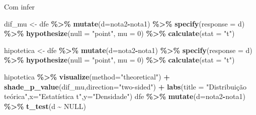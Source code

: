 \documentclass[
  9pt,
  ignorenonframetext,
  aspectratio=169]{beamer}
\newenvironment{Shaded}{\begin{snugshade}}{\end{snugshade}}
\newcommand{\DataTypeTok}[1]{\textcolor[rgb]{0.13,0.29,0.53}{#1}}
\newcommand{\DecValTok}[1]{\textcolor[rgb]{0.00,0.00,0.81}{#1}}
\newcommand{\KeywordTok}[1]{\textcolor[rgb]{0.13,0.29,0.53}{\textbf{#1}}}
\newcommand{\NormalTok}[1]{#1}
\newcommand{\OperatorTok}[1]{\textcolor[rgb]{0.81,0.36,0.00}{\textbf{#1}}}
\newcommand{\OtherTok}[1]{\textcolor[rgb]{0.56,0.35,0.01}{#1}}
\newcommand{\StringTok}[1]{\textcolor[rgb]{0.31,0.60,0.02}{#1}}
\begin{document}
\begin{frame}[fragile]{Com infer}
\protect\hypertarget{com-infer}{}
\begin{Shaded}
\begin{Highlighting}[]
\NormalTok{dif\_mu \textless{}{-}}\StringTok{ }\NormalTok{dfe }\OperatorTok{\%\textgreater{}\%}
\StringTok{  }\KeywordTok{mutate}\NormalTok{(}\DataTypeTok{d=}\NormalTok{nota2}\OperatorTok{{-}}\NormalTok{nota1) }\OperatorTok{\%\textgreater{}\%}
\StringTok{  }\KeywordTok{specify}\NormalTok{(}\DataTypeTok{response =}\NormalTok{ d) }\OperatorTok{\%\textgreater{}\%}
\StringTok{  }\KeywordTok{hypothesize}\NormalTok{(}\DataTypeTok{null =} \StringTok{"point"}\NormalTok{, }\DataTypeTok{mu =} \DecValTok{0}\NormalTok{) }\OperatorTok{\%\textgreater{}\%}
\StringTok{  }\KeywordTok{calculate}\NormalTok{(}\DataTypeTok{stat =} \StringTok{"t"}\NormalTok{)}

\NormalTok{hipotetica \textless{}{-}}\StringTok{ }\NormalTok{dfe }\OperatorTok{\%\textgreater{}\%}
\StringTok{  }\KeywordTok{mutate}\NormalTok{(}\DataTypeTok{d=}\NormalTok{nota2}\OperatorTok{{-}}\NormalTok{nota1) }\OperatorTok{\%\textgreater{}\%}
\StringTok{  }\KeywordTok{specify}\NormalTok{(}\DataTypeTok{response =}\NormalTok{ d) }\OperatorTok{\%\textgreater{}\%}
\StringTok{  }\KeywordTok{hypothesize}\NormalTok{(}\DataTypeTok{null =} \StringTok{"point"}\NormalTok{, }\DataTypeTok{mu =} \DecValTok{0}\NormalTok{) }\OperatorTok{\%\textgreater{}\%}
\StringTok{  }\KeywordTok{calculate}\NormalTok{(}\DataTypeTok{stat =} \StringTok{"t"}\NormalTok{)}
\end{Highlighting}
\end{Shaded}

\begin{Shaded}
\begin{Highlighting}[]
\NormalTok{hipotetica }\OperatorTok{\%\textgreater{}\%}\StringTok{ }\KeywordTok{visualize}\NormalTok{(}\DataTypeTok{method=}\StringTok{"theoretical"}\NormalTok{) }\OperatorTok{+}\StringTok{ }
\StringTok{  }\KeywordTok{shade\_p\_value}\NormalTok{(dif\_mu,}\DataTypeTok{direction=}\StringTok{"two{-}sided"}\NormalTok{) }\OperatorTok{+}
\StringTok{  }\KeywordTok{labs}\NormalTok{(}\DataTypeTok{title =} \StringTok{"Distribuição teórica"}\NormalTok{,}\DataTypeTok{x=}\StringTok{"Estatística t"}\NormalTok{,}\DataTypeTok{y=}\StringTok{"Densidade"}\NormalTok{)}
\NormalTok{dfe }\OperatorTok{\%\textgreater{}\%}\StringTok{ }\KeywordTok{mutate}\NormalTok{(}\DataTypeTok{d=}\NormalTok{nota2}\OperatorTok{{-}}\NormalTok{nota1) }\OperatorTok{\%\textgreater{}\%}\StringTok{  }\KeywordTok{t\_test}\NormalTok{(d }\OperatorTok{\textasciitilde{}}\StringTok{ }\OtherTok{NULL}\NormalTok{)}
\end{Highlighting}
\end{Shaded}
\end{frame}
\end{document}
